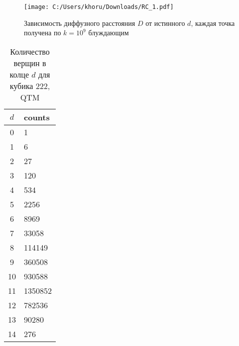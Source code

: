 \begin{figure}[h]
    \centering
    \texttt{[image: C:/Users/khoru/Downloads/RC\_1.pdf]}
    \caption{Зависимость диффузного расстояния $D$ от истинного $d$, каждая точка получена по $k=10^{9}$ блуждающим}
    \label{fig:1}
\end{figure}



\begin{table}
\caption{Количество верщин в колце $d$ для кубика 222, QTM}
\begin{tabular}{cl}
\toprule
$d$ & counts \\
\midrule
0  & 1 \\
1  & 6 \\
2  & 27 \\
3  & 120 \\
4  & 534 \\
5  & 2256 \\
6  & 8969 \\
7  & 33058 \\
8  & 114149 \\
9  & 360508 \\
10 & 930588 \\
11 & 1350852 \\
12 & 782536 \\
13 & 90280 \\
14 & 276 \\
\bottomrule
\end{tabular}
\end{table}



\newpage

\phantom{42}

\newpage

\phantom{42}